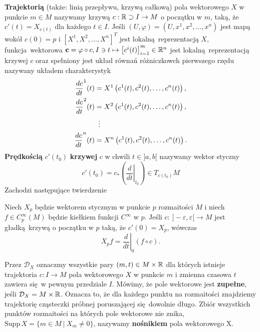 \textbf{Trajektorią} (także: linią przepływu, krzywą całkową) pola wektorowego \(X\) w punkcie \(m\in M\) nazywamy krzywą \(c: \mathbb{R} \supset I \rightarrow M\) o początku w \(m\), taką, że \(c'(t) = X_{c(t)}\) dla każdego \(t\in I\). Jeśli \((U, \varphi) = (U, x^1, x^2, \dots, x^n)\) jest mapą wokół \(c(0)=p\) i \([X^1, X^2, \dots, X^n]^T\) jest lokalną reprezentacją \(X\), funkcja wektorowa \(\mathbf{c} = \varphi \circ c, I \ni t \mapsto \left[c^i(t)\right]_{i=1}^m \in \mathbb{R}^n\) jest lokalną reprezentacją krzywej \(c\) oraz spełniony jest układ równań różniczkowch pierwszego rzędu nazywany układem charakterystyk
\begin{align*}
    \frac{dc}{dt}^1(t) &= X^1\left(c^1(t), c^2(t), \dots, c^n(t)\right),\\
    \frac{dc}{dt}^2(t) &= X^2\left(c^1(t), c^2(t), \dots, c^n(t)\right),\\
    &\mathrel{\makebox[\widthof{=}]{\vdots}}  \\
    \frac{dc}{dt}^n(t) &= X^n\left(c^1(t), c^2(t), \dots, c^n(t)\right).
\end{align*}
\textbf{Prędkością} \(c'(t_0)\) \textbf{krzywej} \(c\) w chwili \(t\in]a, b[\) nazywamy wektor styczny
\begin{equation}
c'(t_0) = c_\ast\left(\left.\frac{d}{dt}\right|_{t_0}\right)\in T_{c(t_0)}M
\end{equation}
Zachodzi następujące twierdzenie
\begin{twierdzenie}
Niech \(X_p\) będzie wektorem stycznym w punkcie \(p\) rozmaitości \(M\) i niech \(f\in C_p^\infty(M)\) będzie kiełkiem funkcji \(C^\infty\) w \(p\). Jeśli \(c:\:]-\varepsilon,\varepsilon[\rightarrow M\) jest gładką krzywą o początku w \(p\) taką, że \(c'(0)=X_p\), wówczas
\begin{equation}
X_pf=\left.\frac{d}{dt}\right|_0(f\circ c).
\end{equation}

\end{twierdzenie}
Przez \(\mathcal{D}_X\) oznaczmy wszystkie pary \((m, t)\in M \times \mathbb{R}\) dla których istnieje trajektoria \(c: I\rightarrow M\) pola wektorowego \(X\) w punkcie \(m\) i zmienna czasowa \(t\) zawiera się w pewnym przedziale \(I\). Mówimy, że pole wektorowe jest \textbf{zupełne}, jeśli \(\mathcal{D}_X = M \times \mathbb{R}\). Oznacza to, że dla każdego punktu na rozmaitości znajdziemy trajektorię cząsteczki próbnej poruszającej się dowolnie długo. Zbiór wszystkich punktów rozmaitości na których pole wektorowe nie znika, \(\mathrm{Supp}\,X=\{m\in M\:|\: X_m\neq 0\}\), nazywamy \textbf{nośnikiem} pola wektorowego X. 

